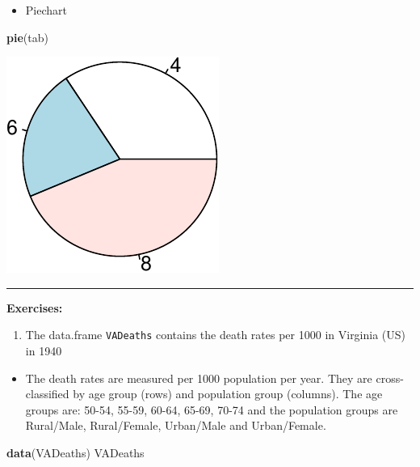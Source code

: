 \documentclass[]{article}
\def\tightlist{}
\newenvironment{Shaded}{\begin{snugshade}}{\end{snugshade}}
\newcommand{\KeywordTok}[1]{\textcolor[rgb]{0.13,0.29,0.53}{\textbf{{#1}}}}
\newcommand{\NormalTok}[1]{{#1}}
\numberwithin{equation}{section}
\begin{document}
\begin{itemize}
\tightlist
\item
  Piechart
\end{itemize}

\begin{Shaded}
\begin{Highlighting}[]
\KeywordTok{pie}\NormalTok{(tab)}
\end{Highlighting}
\end{Shaded}

\begin{center}\includegraphics{index_files/figure-latex/unnamed-chunk-63-1} \end{center}

\begin{center}\rule{0.5\linewidth}{\linethickness}\end{center}

\textbf{Exercises:}

\begin{enumerate}
\def\labelenumi{\arabic{enumi}.}
\tightlist
\item
  The data.frame \texttt{VADeaths} contains the death rates per 1000 in
  Virginia (US) in 1940
\end{enumerate}

\begin{itemize}
\tightlist
\item
  The death rates are measured per 1000 population per year. They are
  cross-classified by age group (rows) and population group (columns).
  The age groups are: 50-54, 55-59, 60-64, 65-69, 70-74 and the
  population groups are Rural/Male, Rural/Female, Urban/Male and
  Urban/Female.
\end{itemize}

\begin{Shaded}
\begin{Highlighting}[]
\KeywordTok{data}\NormalTok{(VADeaths)}
\NormalTok{VADeaths}
\end{Highlighting}
\end{Shaded}
\end{document}
